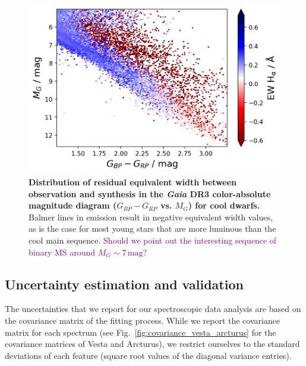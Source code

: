 \documentclass[
  journal=pasa,
  manuscript=research-paper, %
  year=2023,
  volume=37
]{cup-journal}
\newcommand{\SB}[1]{{\textcolor{purple}{#1}}}
\newcommand{\Gaia}{\textit{Gaia}\xspace}
\begin{document}
\begin{figure}[ht]
 \centering
 \includegraphics[width=\textwidth]{figures/emission_young_stars.png}
 \caption{\textbf{Distribution of residual equivalent width between observation and synthesis in the \Gaia DR3 color-absolute magnitude diagram ($G_{BP}-G_{RP}$ vs. $M_G$) for cool dwarfs.} Balmer lines in emission result in negative equivalent width values, as is the case for most young stars that are more luminous than the cool main sequence. \SB{Should we point out the interesting sequence of binary MS around $M_G \sim 7\,\mathrm{mag}$?}} \label{fig:emission_young_stars.png}
\end{figure}


\subsection{Uncertainty estimation and validation}
\label{sec:uncertainty}

The uncertainties that we report for our spectroscopic data analysis are based on the covariance matrix of the fitting process. While we report the covariance matrix for each spectrum (see Fig.~\ref{fig:covariance_vesta_arcturus} for the covariance matrices of Vesta and Arcturus), we restrict ourselves to the standard deviations of each feature (square root values of the diagonal variance entries).
\end{document}
